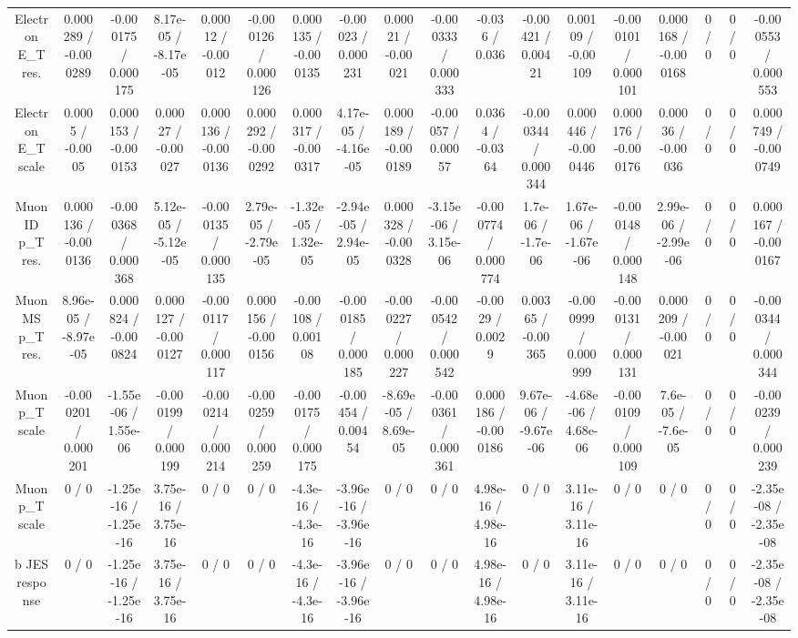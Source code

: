 \documentclass[10pt]{article}
\begin{document}
\begin{table}[htbp]
\begin{center}
\begin{tabular}{|c|c|c|c|c|c|c|c|c|c|c|c|c|c|c|c|c|c|}
  Electron E_{T} res. & 0.000289 / -0.000289 & -0.000175 / 0.000175 & 8.17e-05 / -8.17e-05 & 0.00012 / -0.00012 & -0.000126 / 0.000126 & 0.000135 / -0.000135 & -0.00023 / 0.000231 & 0.00021 / -0.00021 & -0.000333 / 0.000333 & -0.036 / 0.036 & -0.00421 / 0.00421 & 0.00109 / -0.00109 & -0.000101 / 0.000101 & 0.000168 / -0.000168 & 0 / 0 & 0 / 0 & -0.000553 / 0.000553 \\ 
  Electron E_{T} scale & 0.0005 / -0.0005 & 0.000153 / -0.000153 & 0.00027 / -0.00027 & 0.000136 / -0.000136 & 0.000292 / -0.000292 & 0.000317 / -0.000317 & 4.17e-05 / -4.16e-05 & 0.000189 / -0.000189 & -0.00057 / 0.00057 & 0.0364 / -0.0364 & -0.000344 / 0.000344 & 0.000446 / -0.000446 & 0.000176 / -0.000176 & 0.00036 / -0.00036 & 0 / 0 & 0 / 0 & 0.000749 / -0.000749 \\ 
  Muon ID p_{T} res. & 0.000136 / -0.000136 & -0.000368 / 0.000368 & 5.12e-05 / -5.12e-05 & -0.000135 / 0.000135 & 2.79e-05 / -2.79e-05 & -1.32e-05 / 1.32e-05 & -2.94e-05 / 2.94e-05 & 0.000328 / -0.000328 & -3.15e-06 / 3.15e-06 & -0.000774 / 0.000774 & 1.7e-06 / -1.7e-06 & 1.67e-06 / -1.67e-06 & -0.000148 / 0.000148 & 2.99e-06 / -2.99e-06 & 0 / 0 & 0 / 0 & 0.000167 / -0.000167 \\ 
  Muon MS p_{T} res. & 8.96e-05 / -8.97e-05 & 0.000824 / -0.000824 & 0.000127 / -0.000127 & -0.000117 / 0.000117 & 0.000156 / -0.000156 & -0.00108 / 0.00108 & -0.000185 / 0.000185 & -0.000227 / 0.000227 & -0.000542 / 0.000542 & -0.0029 / 0.0029 & 0.00365 / -0.00365 & -0.000999 / 0.000999 & -0.000131 / 0.000131 & 0.000209 / -0.00021 & 0 / 0 & 0 / 0 & -0.000344 / 0.000344 \\ 
  Muon p_{T} scale & -0.000201 / 0.000201 & -1.55e-06 / 1.55e-06 & -0.000199 / 0.000199 & -0.000214 / 0.000214 & -0.000259 / 0.000259 & -0.000175 / 0.000175 & -0.00454 / 0.00454 & -8.69e-05 / 8.69e-05 & -0.000361 / 0.000361 & 0.000186 / -0.000186 & 9.67e-06 / -9.67e-06 & -4.68e-06 / 4.68e-06 & -0.000109 / 0.000109 & 7.6e-05 / -7.6e-05 & 0 / 0 & 0 / 0 & -0.000239 / 0.000239 \\ 
  Muon p_{T} scale & 0 / 0 & -1.25e-16 / -1.25e-16 & 3.75e-16 / 3.75e-16 & 0 / 0 & 0 / 0 & -4.3e-16 / -4.3e-16 & -3.96e-16 / -3.96e-16 & 0 / 0 & 0 / 0 & 4.98e-16 / 4.98e-16 & 0 / 0 & 3.11e-16 / 3.11e-16 & 0 / 0 & 0 / 0 & 0 / 0 & 0 / 0 & -2.35e-08 / -2.35e-08 \\ 
  b JES response & 0 / 0 & -1.25e-16 / -1.25e-16 & 3.75e-16 / 3.75e-16 & 0 / 0 & 0 / 0 & -4.3e-16 / -4.3e-16 & -3.96e-16 / -3.96e-16 & 0 / 0 & 0 / 0 & 4.98e-16 / 4.98e-16 & 0 / 0 & 3.11e-16 / 3.11e-16 & 0 / 0 & 0 / 0 & 0 / 0 & 0 / 0 & -2.35e-08 / -2.35e-08 \\ 

\end{tabular}
\end{center}
\end{table}
\end{document}
